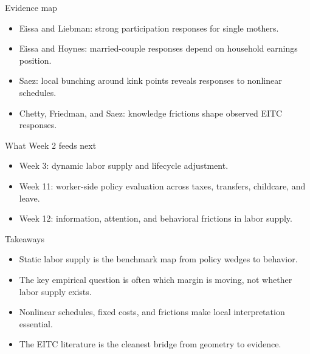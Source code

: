 \documentclass[aspectratio=169,11pt]{beamer}
\begin{document}
\begin{frame}{Evidence map}
\begin{itemize}
    \item Eissa and Liebman: strong participation responses for single mothers.
    \item Eissa and Hoynes: married-couple responses depend on household earnings position.
    \item Saez: local bunching around kink points reveals responses to nonlinear schedules.
    \item Chetty, Friedman, and Saez: knowledge frictions shape observed EITC responses.
\end{itemize}
\end{frame}

\begin{frame}{What Week 2 feeds next}
\begin{itemize}
    \item Week 3: dynamic labor supply and lifecycle adjustment.
    \item Week 11: worker-side policy evaluation across taxes, transfers, childcare, and leave.
    \item Week 12: information, attention, and behavioral frictions in labor supply.
\end{itemize}
\end{frame}

\begin{frame}{Takeaways}
\begin{itemize}
    \item Static labor supply is the benchmark map from policy wedges to behavior.
    \item The key empirical question is often which margin is moving, not whether labor supply exists.
    \item Nonlinear schedules, fixed costs, and frictions make local interpretation essential.
    \item The EITC literature is the cleanest bridge from geometry to evidence.
\end{itemize}
\end{frame}
\end{document}
